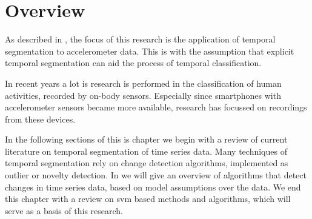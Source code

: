 \section{Overview}\label{sec:literature_review_overview}
As described in , the focus of this research is the application of temporal segmentation to accelerometer data.
This is with the assumption that explicit temporal segmentation can aid the process of temporal classification.


In recent years a lot is research is performed in the classification of human activities, recorded by on-body sensors.
Especially since smartphones with accelerometer sensors became more available, research has focussed on recordings from these devices.


In the following sections of this is chapter we begin with a review of current literature on temporal segmentation of time series data.
Many techniques of temporal segmentation rely on change detection algorithms, implemented as outlier or novelty detection.
In  we will give an overview of algorithms that detect changes in time series data, based on model assumptions over the data.
We end this chapter with a review on \gls{svm} based methods and algorithms, which will serve as a basis of this research.


